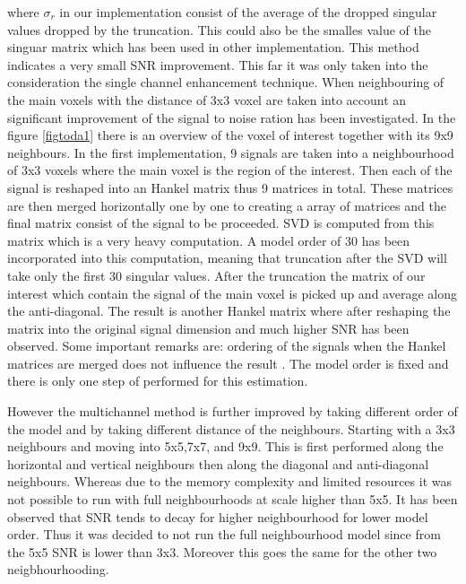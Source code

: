 where $\sigma_{r}$ in our implementation consist of the average of the dropped singular values dropped by the truncation\cite{11}. This could also be the smalles value of the singuar matrix which has been used in other implementation\cite{2}. This method indicates a very small SNR improvement. This far it was only taken into the consideration the single channel enhancement technique. When neighbouring of the main voxels with the distance of 3x3 voxel are taken into account an significant improvement of the signal to noise ration has been investigated. In the figure \ref{figtoda1} there is an overview of the voxel of interest together with its 9x9 neighbours. In the first implementation, 9 signals are taken into a neighbourhood of 3x3 voxels where the main voxel is the region of the interest. Then each of the signal is reshaped into an Hankel matrix thus 9 matrices in total. These matrices are then merged horizontally one by one to creating a array of matrices and the final matrix consist of the signal to be proceeded. SVD is computed from this matrix which is a very heavy computation. A model order of 30 has been incorporated into this computation, meaning that truncation after the SVD will take only the first 30 singular values. After the truncation the matrix of our interest which contain the signal of the main voxel is picked up and average along the anti-diagonal. The result is another Hankel matrix where after reshaping the matrix into the original signal dimension and much higher SNR has been observed. Some important remarks are: ordering of the signals when the Hankel matrices are merged does not influence the result \cite{14}. The model order is fixed and there is only one step of performed for this estimation. 

However the multichannel method is further improved by taking different order of the model and by taking different distance of the neighbours. Starting with a 3x3 neighbours and moving into 5x5,7x7, and 9x9. This is first performed along the horizontal and vertical neighbours then along the diagonal and anti-diagonal neighbours. Whereas due to the memory complexity and limited resources it was not possible to run with full neighbourhoods at scale higher than 5x5. It has been observed that SNR tends to decay for higher neighbourhood for lower model order. Thus it was decided to not run the full neighbourhood model since from the 5x5 SNR is lower than 3x3. Moreover this goes the same for the other two neigbhourhooding.  


